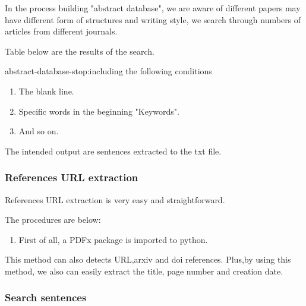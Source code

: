 In the process building "abstract database", we are aware of different papers may have different form of structures 
and writing style, we search through numbers of articles from different journals.

Table below are the results of the search.



abstract-database-stop:including the following conditions

\begin{enumerate}
	
	\item The blank line.
	\item Specific words in the beginning "Keywords".
	\item And so on.
	
\end{enumerate}

The intended output are sentences extracted to the txt file.


\subsubsection{References URL extraction}

References URL extraction is very easy and straightforward.

The procedures are below:

\begin{enumerate}
	
	\item First of all, a PDFx package is imported to python.

	
\end{enumerate}

This method can also detects URL,arxiv and doi references.  
Plus,by using this method, we also can easily extract the title, page number and creation date. 


\subsubsection{Search sentences}

